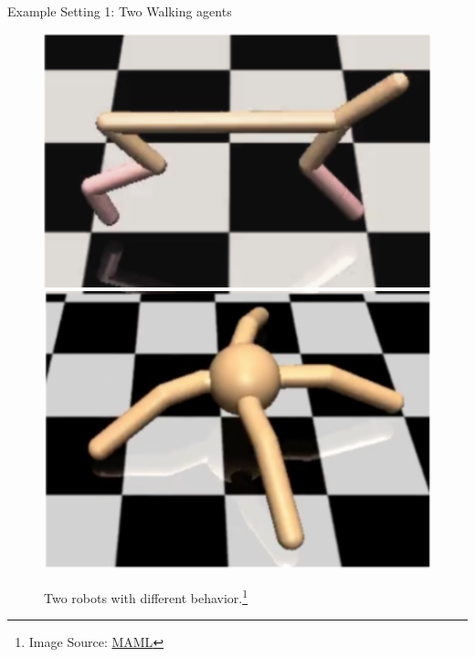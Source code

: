 \documentclass[aspectratio=169]{../latex_main/tntbeamer}  %
\begin{document}
\begin{frame}[c]{Example Setting 1: Two Walking agents}

\begin{figure}
\centering
\includegraphics[scale=0.5]{images/cheetah}
\includegraphics[scale=0.5]{images/ant}
\caption{Two robots with different behavior.\footnote{Image Source: \href{https://arxiv.org/pdf/1703.03400.pdf}{MAML}}}
\end{figure}

\end{frame}
\end{document}
